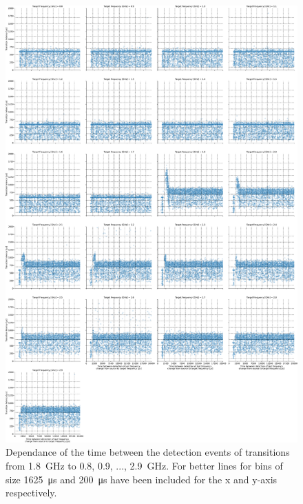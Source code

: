 \begin{figure}[]
    \centering
    \includegraphics[width=\columnwidth]{fig/ftalat_scatter_wait_transition_latency_hati_source_1.8.pdf}
    \caption{Dependance of the time between the detection events of transitions from \SI{1.8}{\GHz} to \SI{0.8}{}, \SI{0.9}{}, ..., \SI{2.9}{\GHz}. For better lines for bins of size \SI{1625}{\us} and \SI{200}{\us} have been included for the x and y-axis respectively.}
\end{figure}
